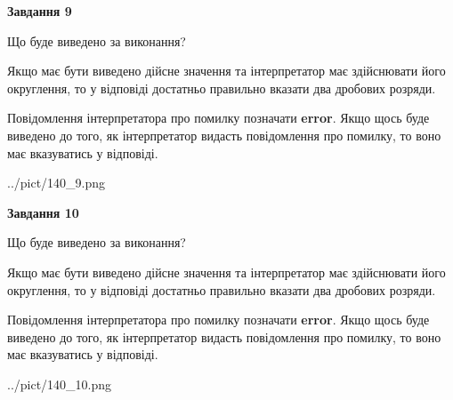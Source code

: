 \documentclass[12pt, ukrainian]{article}
\begin{document}
{\begin {Large}
{\begin {center}\textbf{Завдання 9}\end {center}}\par
Що буде виведено за виконання? \par

Якщо має бути виведено дійсне значення та інтерпретатор має здійснювати його округлення, 
то у відповіді достатньо правильно вказати два дробових розряди.

Повідомлення інтерпретатора про помилку позначати \textbf{error}.
Якщо щось буде виведено до того, як інтерпретатор видасть повідомлення про помилку, 
то воно має вказуватись у відповіді. \par

\begin{center}
	{../pict/140_9.png}
\end{center}
\newpage

{\begin {center}\textbf{Завдання 10}\end {center}}\par
Що буде виведено за виконання? \par

Якщо має бути виведено дійсне значення та інтерпретатор має здійснювати його округлення, 
то у відповіді достатньо правильно вказати два дробових розряди.

Повідомлення інтерпретатора про помилку позначати \textbf{error}.
Якщо щось буде виведено до того, як інтерпретатор видасть повідомлення про помилку, 
то воно має вказуватись у відповіді. \par

\begin{center}
	{../pict/140_10.png}
\end{center}
\newpage

\end {Large}}
\end{document}
